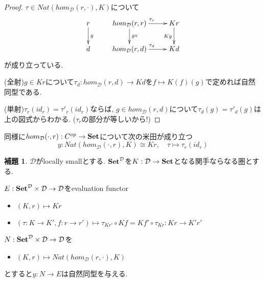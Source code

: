 \documentclass[dvipdfmx,a4paper,11pt]{report}
\theoremstyle{definition}
\newtheorem{lem}[thm]{補題}
\begin{document}
\begin{proof}
$\tau \in Nat(hom_{\mathcal{D}}(r, \cdot), K) $について
\begin{equation*}
\xymatrix@C=25pt@R=20pt{
r\ar@{->}[d]^{g}&
hom_{\mathcal{D}}(r,r) \ar@{->}[d]^{g \circ}  \ar@{->}[r]^{\tau_r}
 &Kr\ar@{->}[d]_{Kg}\\
 d &
hom_{\mathcal{D}}(r,d) \ar@{->}[r]^{\tau_d}
& Kd\\   
}
\end{equation*}
が成り立っている. 

(全射)$g \in Kr$について$\tau_d : hom_{\mathcal{D}}(r,d) \to  Kd$を$f \mapsto K(f) (g)$で定めれば自然同型である.

(単射)$\tau_{r}(id_{r}) = \tau'_{r}(id_{r})$ならば, $g \in hom_{\mathcal{D}}(r,d)$について$\tau_d(g)=\tau'_{d}(g)$は上の図式からわかる. ($\tau_r$の部分が等しいから!)

\end{proof}

同様に$hom_{\mathcal{D}}(\cdot, r) : C^{op} \to {\bf Set}$について次の米田が成り立つ
$$
y : Nat(hom_{\mathcal{D}}(\cdot, r), K) \cong Kr, \quad  \tau \mapsto\tau_{r}(id_{r})
$$


 \begin{tcolorbox}
 [colback = white, colframe = green!35!black, fonttitle = \bfseries,breakable = true]
\begin{lem}
$\mathcal{D} $がlocally smallとする. 
${\bf Set}^{\mathcal{D}}$を$K : \mathcal{D} \to {\bf Set}$となる関手ならなる圏とする.

$E: {\bf Set}^{\mathcal{D}} \times \mathcal{D} \to \mathcal{D}$をevaluation functor
\begin{itemize}
\item $(K,r) \mapsto Kr$
\item $(\tau :K\to K', f : r \to r') \mapsto  \tau_{Kr'} \circ Kf = Kf'\circ\tau_{Kr}:Kr \to K'r'$
\end{itemize}

$N: {\bf Set}^{\mathcal{D}} \times \mathcal{D} \to \mathcal{D}$を
\begin{itemize}
\item $(K,r) \mapsto  Nat(hom_{\mathcal{D}}(r, \cdot), K)$
\end{itemize}
とすると$y : N \to E$は自然同型を与える.

\end{lem}
 \end{tcolorbox}
\end{document}

